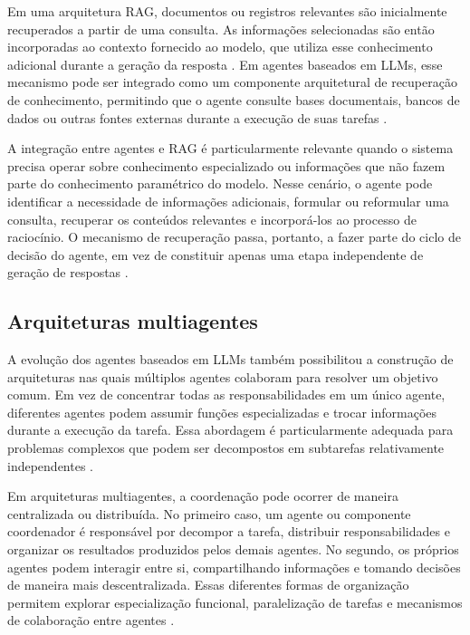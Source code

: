 Em uma arquitetura RAG, documentos ou registros relevantes são inicialmente recuperados a partir de uma consulta. As informações selecionadas são então incorporadas ao contexto fornecido ao modelo, que utiliza esse conhecimento adicional durante a geração da resposta \cite{lewis2020rag}. Em agentes baseados em LLMs, esse mecanismo pode ser integrado como um componente arquitetural de recuperação de conhecimento, permitindo que o agente consulte bases documentais, bancos de dados ou outras fontes externas durante a execução de suas tarefas \cite{zhao2023survey}.

A integração entre agentes e RAG é particularmente relevante quando o sistema precisa operar sobre conhecimento especializado ou informações que não fazem parte do conhecimento paramétrico do modelo. Nesse cenário, o agente pode identificar a necessidade de informações adicionais, formular ou reformular uma consulta, recuperar os conteúdos relevantes e incorporá-los ao processo de raciocínio. O mecanismo de recuperação passa, portanto, a fazer parte do ciclo de decisão do agente, em vez de constituir apenas uma etapa independente de geração de respostas \cite{lewis2020rag,zhao2023survey}.

\subsection{Arquiteturas multiagentes}

A evolução dos agentes baseados em LLMs também possibilitou a construção de arquiteturas nas quais múltiplos agentes colaboram para resolver um objetivo comum. Em vez de concentrar todas as responsabilidades em um único agente, diferentes agentes podem assumir funções especializadas e trocar informações durante a execução da tarefa. Essa abordagem é particularmente adequada para problemas complexos que podem ser decompostos em subtarefas relativamente independentes \cite{cheng2026,zhao2023survey}.

Em arquiteturas multiagentes, a coordenação pode ocorrer de maneira centralizada ou distribuída. No primeiro caso, um agente ou componente coordenador é responsável por decompor a tarefa, distribuir responsabilidades e organizar os resultados produzidos pelos demais agentes. No segundo, os próprios agentes podem interagir entre si, compartilhando informações e tomando decisões de maneira mais descentralizada. Essas diferentes formas de organização permitem explorar especialização funcional, paralelização de tarefas e mecanismos de colaboração entre agentes \cite{cheng2026,zhao2023survey}.

